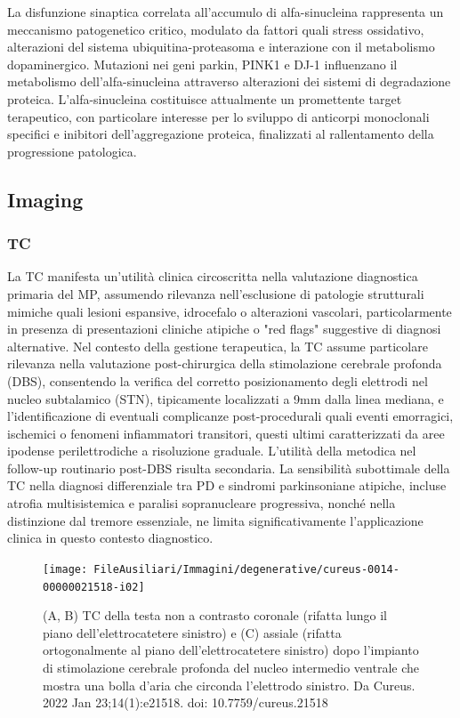 La disfunzione sinaptica correlata all'accumulo di alfa-sinucleina rappresenta un meccanismo patogenetico critico, modulato da fattori quali stress ossidativo, alterazioni del sistema ubiquitina-proteasoma e interazione con il metabolismo dopaminergico. Mutazioni nei geni parkin, PINK1 e DJ-1 influenzano il metabolismo dell'alfa-sinucleina attraverso alterazioni dei sistemi di degradazione proteica.
L'alfa-sinucleina costituisce attualmente un promettente target terapeutico, con particolare interesse per lo sviluppo di anticorpi monoclonali specifici e inibitori dell'aggregazione proteica, finalizzati al rallentamento della progressione patologica.

\subsection{Imaging}

\subsubsection{TC}
La TC manifesta un'utilità clinica circoscritta nella valutazione diagnostica primaria del MP, assumendo rilevanza nell'esclusione di patologie strutturali mimiche quali lesioni espansive, idrocefalo o alterazioni vascolari, particolarmente in presenza di presentazioni cliniche atipiche o "red flags" suggestive di diagnosi alternative.
Nel contesto della gestione terapeutica, la TC assume particolare rilevanza nella valutazione post-chirurgica della stimolazione cerebrale profonda (DBS), consentendo la verifica del corretto posizionamento degli elettrodi nel nucleo subtalamico (STN), tipicamente localizzati a 9mm dalla linea mediana, e l'identificazione di eventuali complicanze post-procedurali quali eventi emorragici, ischemici o fenomeni infiammatori transitori, questi ultimi caratterizzati da aree ipodense perilettrodiche a risoluzione graduale. L'utilità della metodica nel follow-up routinario post-DBS risulta secondaria.
La sensibilità subottimale della TC nella diagnosi differenziale tra PD e sindromi parkinsoniane atipiche, incluse atrofia multisistemica e paralisi sopranucleare progressiva, nonché nella distinzione dal tremore essenziale, ne limita significativamente l'applicazione clinica in questo contesto diagnostico.

\begin{figure}[h]
	\centering
	\texttt{[image: FileAusiliari/Immagini/degenerative/cureus-0014-00000021518-i02]}
	\caption[Complicanze DBS]{(A, B) TC della testa non a contrasto coronale (rifatta lungo il piano dell'elettrocatetere sinistro) e (C) assiale (rifatta ortogonalmente al piano dell'elettrocatetere sinistro) dopo l'impianto di stimolazione cerebrale profonda del nucleo intermedio ventrale che mostra una bolla d'aria che circonda l'elettrodo sinistro. Da Cureus. 2022 Jan 23;14(1):e21518. doi: 10.7759/cureus.21518}
	\label{fig:cureus-0014-00000021518-i02}
\end{figure}

